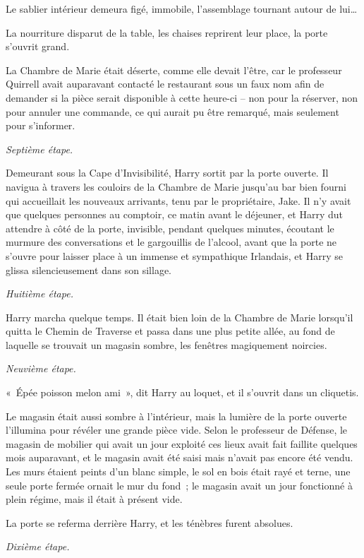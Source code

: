 Le sablier intérieur demeura figé, immobile, l'assemblage tournant autour de lui…

La nourriture disparut de la table, les chaises reprirent leur place, la porte s'ouvrit grand.

La Chambre de Marie était déserte, comme elle devait l'être, car le professeur Quirrell avait auparavant contacté le restaurant sous un faux nom afin de demander si la pièce serait disponible à cette heure-ci -- non pour la réserver, non pour annuler une commande, ce qui aurait pu être remarqué, mais seulement pour s'informer.

\emph{Septième étape.}

Demeurant sous la Cape d'Invisibilité, Harry sortit par la porte ouverte. Il navigua à travers les couloirs de la Chambre de Marie jusqu'au bar bien fourni qui accueillait les nouveaux arrivants, tenu par le propriétaire, Jake. Il n'y avait que quelques personnes au comptoir, ce matin avant le déjeuner, et Harry dut attendre à côté de la porte, invisible, pendant quelques minutes, écoutant le murmure des conversations et le gargouillis de l'alcool, avant que la porte ne s'ouvre pour laisser place à un immense et sympathique Irlandais, et Harry se glissa silencieusement dans son sillage.

\emph{Huitième étape.}

Harry marcha quelque temps. Il était bien loin de la Chambre de Marie lorsqu'il quitta le Chemin de Traverse et passa dans une plus petite allée, au fond de laquelle se trouvait un magasin sombre, les fenêtres magiquement noircies.

\emph{Neuvième étape.}

«~Épée poisson melon ami~», dit Harry au loquet, et il s'ouvrit dans un cliquetis.

Le magasin était aussi sombre à l'intérieur, mais la lumière de la porte ouverte l'illumina pour révéler une grande pièce vide. Selon le professeur de Défense, le magasin de mobilier qui avait un jour exploité ces lieux avait fait faillite quelques mois auparavant, et le magasin avait été saisi mais n'avait pas encore été vendu. Les murs étaient peints d'un blanc simple, le sol en bois était rayé et terne, une seule porte fermée ornait le mur du fond~; le magasin avait un jour fonctionné à plein régime, mais il était à présent vide.

La porte se referma derrière Harry, et les ténèbres furent absolues.

\emph{Dixième étape.}

